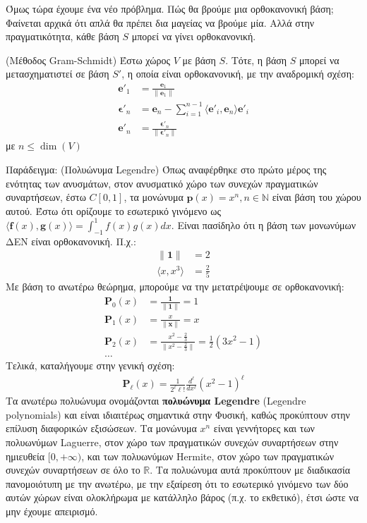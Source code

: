 \documentclass[main.tex]{subfiles}
\begin{document}
	Όμως τώρα έχουμε ένα νέο πρόβλημα. Πώς θα βρούμε μια ορθοκανονική βάση; Φαίνεται αρχικά ότι απλά θα πρέπει δια μαγείας να βρούμε μία. Αλλά στην πραγματικότητα, κάθε βάση $S$ μπορεί να γίνει ορθοκανονική.
	\begin{theorem}
		(Μέθοδος Gram-Schmidt) Έστω χώρος $V$ με βάση $S$. Τότε, η βάση $S$ μπορεί να μετασχηματιστεί σε βάση $S'$, η οποία είναι ορθοκανονική, με την αναδρομική σχέση:
		\begin{align*}
			\boldsymbol{e}'_1 &= \frac{\boldsymbol{e}_1}{\|\boldsymbol{e}_1\|} \\
			\boldsymbol{\epsilon}'_n &= \boldsymbol{e}_n - \sum_{i=1}^{n-1}\langle\boldsymbol{e}'_i,\boldsymbol{e}_n\rangle\boldsymbol{e}'_i\\
			\boldsymbol{e}'_n &= \frac{\boldsymbol{\epsilon}'_n}{\|\boldsymbol{\epsilon}'_n\|}
		\end{align*}
		με $n\leq \dim(V)$
	\end{theorem}
	\newpage
	Παράδειγμα: (Πολυώνυμα Legendre)
	Όπως αναφέρθηκε στο πρώτο μέρος της ενότητας των ανυσμάτων, στον ανυσματικό χώρο των συνεχών πραγματικών συναρτήσεων, έστω $C[0,1]$, τα μονώνυμα ${\boldsymbol{p}(x) = x^n, n\in\mathbb{N}}$ είναι βάση του χώρου αυτού. Έστω ότι ορίζουμε το εσωτερικό γινόμενο ως ${\langle\boldsymbol{f}(x),\boldsymbol{g}(x)\rangle= \int^{1}_{-1}f(x)g(x)dx}$. Είναι πασίδηλο ότι η βάση των μονωνύμων ΔΕΝ είναι ορθοκανονική. Π.χ.:
	\begin{align*}
		\|\boldsymbol{1}\| &= 2\\
		\langle x, x^3\rangle &= \frac{2}{5}
	\end{align*}
	Με βάση το ανωτέρω θεώρημα, μπορούμε να την μετατρέψουμε σε ορθοκανονική:
	\begin{align*}
		\boldsymbol{P}_0(x) &= \frac{\boldsymbol{1}}{\|\boldsymbol{1}\|} = 1 \\
		\boldsymbol{P}_1(x) &= \frac{x}{\|\boldsymbol{x}\|} = x \\
		\boldsymbol{P}_2(x) &= \frac{x^2 - \frac{2}{3}}{\|x^2 - \frac{2}{3}\|} = \frac{1}{2}\left(3x^2 - 1\right)\\
		\ldots
	\end{align*}
	Τελικά, καταλήγουμε στην γενική σχέση:
	\begin{align*}
		\boldsymbol{P}_\ell(x) = \frac{1}{2^\ell\ell!}\frac{d^\ell}{dx^\ell}(x^2 - 1)^\ell
	\end{align*}
	Τα ανωτέρω πολυώνυμα ονομάζονται \textbf{πολυώνυμα Legendre} (Legendre polynomials) και είναι ιδιαιτέρως σημαντικά στην Φυσική, καθώς προκύπτουν στην επίλυση διαφορικών εξισώσεων. Τα μονώνυμα $x^n$ είναι γεννήτορες και των πολυωνύμων Laguerre, στον χώρο των πραγματικών συνεχών συναρτήσεων στην ημιευθεία $[0,+\infty)$, και των πολυωνύμων Hermite, στον χώρο των πραγματικών συνεχών συναρτήσεων σε όλο το $\mathbb{R}$. Τα πολυώνυμα αυτά προκύπτουν με διαδικασία πανομοιότυπη με την ανωτέρω, με την εξαίρεση ότι το εσωτερικό γινόμενο των δύο αυτών χώρων είναι ολοκλήρωμα με κατάλληλο βάρος (π.χ. το εκθετικό), έτσι ώστε να μην έχουμε απειρισμό.
	
\end{document}
